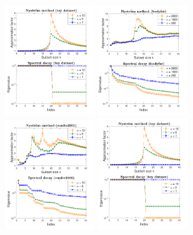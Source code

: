 \documentclass{article}
\begin{document}
\begin{figure}[t]
   \centering
  \ifisarxiv
  \includegraphics[width=0.345\textwidth]{figs/nystrom/rbf-toy-double}
   \hspace{-6mm}
  \includegraphics[width=0.345\textwidth]{figs/nystrom/rbf-bodyfat-double}
  \hspace{-6mm}
  \includegraphics[width=0.345\textwidth]{figs/nystrom/rbf-eunite2001-double}
  \vspace{-5mm}
  \else
    \includegraphics[width=0.35\textwidth]{figs/nystrom/rbf-toy-double}

\end{figure}
\end{document}
